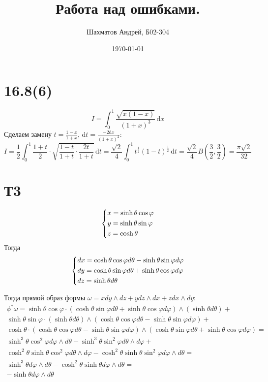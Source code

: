 \documentclass[12pt]{article}
\title{Работа над ошибками.}
\author{Шахматов Андрей, Б02-304}
\date{\today}
\begin{document}
\maketitle

\section*{16.8(6)}
\[
    I = \int_{0}^{1} \frac{\sqrt{x(1-x)} }{(1 + x)^3} \,\mathrm{d}x 
\]
Сделаем замену $t = \frac{1 - x}{1 + x}, \, \mathrm{d}t = \frac{-2\mathrm{d} x}{(1 + x)^2}$: 
\[
    I = \frac{1}{2} \int_{0}^{1} \frac{1 + t}{2} \cdot \sqrt{\frac{1 - t}{1 + t} \cdot \frac{2t}{1 + t}} \,\mathrm{d}t = 
    \frac{\sqrt{2}}{4} \int_{0}^{1} t^{\frac{1}{2}} (1 - t)^{\frac{1}{2}} \,\mathrm{d}t = 
    \frac{\sqrt{2}}{4} B\left( \frac{3}{2}, \frac{3}{2} \right) = \frac{\pi \sqrt{2} }{32} 
\] 

\section*{Т3}
\[
    \begin{dcases}
        x = \sinh \theta \cos \varphi \\
        y = \sinh \theta \sin \varphi \\
        z = \cosh \theta
    \end{dcases}
\]
Тогда 
\[
    \begin{dcases}
        dx = \cosh \theta \cos \varphi d \theta - \sinh \theta \sin \varphi d \varphi \\
        dy = \cosh \theta \sin \varphi d \theta + \sinh \theta \cos \varphi d \varphi \\
        dz = \sinh \theta d \theta  
    \end{dcases}
\]

Тогда прямой образ формы $\omega = x dy \wedge dz + y dz \wedge dx + zdx \wedge dy$:
\begin{align*}
    \phi^{\ast}\omega = \sinh \theta \cos \varphi \cdot (\cosh \theta \sin \varphi d \theta + \sinh \theta \cos \varphi d \varphi) \wedge (\sinh \theta d \theta ) + \\
    \sinh \theta \sin \varphi \cdot (\sinh \theta d \theta) \wedge (\cosh \theta \cos \varphi d \theta - \sinh \theta \sin \varphi d \varphi ) + \\
    \cosh \theta \cdot (\cosh \theta \cos \varphi d \theta - \sinh \theta \sin \varphi d \varphi) \wedge (\cosh \theta \sin \varphi d \theta + \sinh \theta \cos \varphi d \varphi ) = \\ 
    \sinh^3 \theta \cos^2 \varphi d\varphi \wedge d \theta - \sinh^3 \theta \sin^2 \varphi d \theta \wedge d \varphi + \\
    \cosh^2 \theta \sinh \theta \cos^2 \varphi d \theta \wedge d \varphi - \cosh^2 \theta \sinh \theta \sin^2 \varphi d \varphi \wedge d \theta = \\
    \sinh^3 \theta d \varphi \wedge d \theta - \cosh^2 \theta \sinh \theta d \varphi \wedge d \theta = \\
    -\sinh \theta d\varphi \wedge d \theta 
\end{align*}
\end{document}
